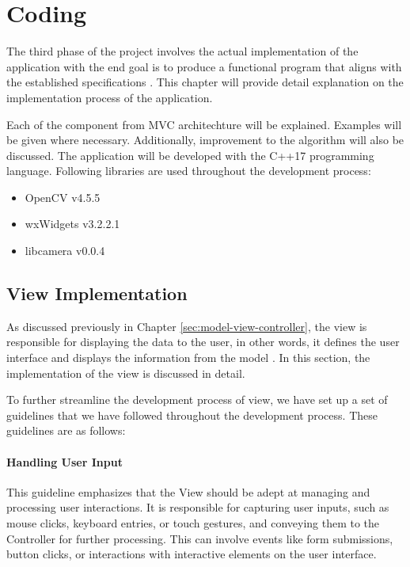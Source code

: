 \chapter{Coding}
\label{chapter:coding}

The third phase of the project involves the actual implementation of the application with the end goal is to produce a functional program that aligns with the established specifications \cite{Hausen}. This chapter will provide detail explanation on the implementation process of the application.

Each of the component from MVC architechture will be explained. Examples will be given where necessary. Additionally, improvement to the algorithm will also be discussed. The application will be developed with the C++17 programming language. Following libraries are used throughout the development process:

\begin{itemize}
    \item OpenCV v4.5.5
    \item wxWidgets v3.2.2.1
    \item libcamera v0.0.4
\end{itemize}

\section{View Implementation}
As discussed previously in Chapter \ref{sec:model-view-controller}, the view is responsible for displaying the data to the user, in other words,  it defines the user interface and displays the information from the model \cite{Krastev20}. In this section, the implementation of the view is discussed in detail.

To further streamline the development process of view, we have set up a set of guidelines that we have followed throughout the development process. These guidelines are as follows:

\subsubsection{Handling User Input}
This guideline emphasizes that the View should be adept at managing and processing user interactions. It is responsible for capturing user inputs, such as mouse clicks, keyboard entries, or touch gestures, and conveying them to the Controller for further processing. This can involve events like form submissions, button clicks, or interactions with interactive elements on the user interface.


